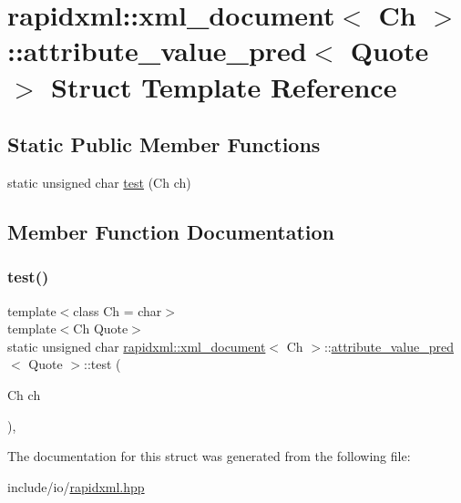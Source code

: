 \hypertarget{structrapidxml_1_1xml__document_1_1attribute__value__pred}{}\section{rapidxml\+::xml\+\_\+document$<$ Ch $>$\+::attribute\+\_\+value\+\_\+pred$<$ Quote $>$ Struct Template Reference}
\label{structrapidxml_1_1xml__document_1_1attribute__value__pred}
\subsection*{Static Public Member Functions}
\begin{DoxyCompactItemize}
\item 
static unsigned char \mbox{\hyperlink{structrapidxml_1_1xml__document_1_1attribute__value__pred_a1c81901177c96057b2808747fc62f9c5}{test}} (Ch ch)
\end{DoxyCompactItemize}


\subsection{Member Function Documentation}
\mbox{\label{structrapidxml_1_1xml__document_1_1attribute__value__pred_a1c81901177c96057b2808747fc62f9c5}} 
\subsubsection{\texorpdfstring{test()}{test()}}
{\footnotesize\ttfamily template$<$class Ch = char$>$ \\
template$<$Ch Quote$>$ \\
static unsigned char \mbox{\hyperlink{classrapidxml_1_1xml__document}{rapidxml\+::xml\+\_\+document}}$<$ Ch $>$\+::\mbox{\hyperlink{structrapidxml_1_1xml__document_1_1attribute__value__pred}{attribute\+\_\+value\+\_\+pred}}$<$ Quote $>$\+::test (\begin{DoxyParamCaption}\item[{Ch}]{ch }\end{DoxyParamCaption})\hspace{0.3cm}{\ttfamily [inline]}, {\ttfamily [static]}}



The documentation for this struct was generated from the following file\+:\begin{DoxyCompactItemize}
\item 
include/io/\mbox{\hyperlink{rapidxml_8hpp}{rapidxml.\+hpp}}\end{DoxyCompactItemize}
